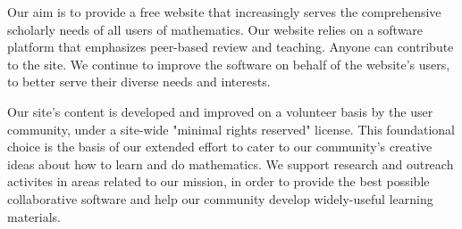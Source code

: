 Our aim is to provide a free website that increasingly serves the comprehensive
scholarly needs of all users of mathematics.
Our website relies on a software platform that emphasizes peer-based review and
teaching. Anyone can contribute to the site. We continue to improve the
software on behalf of the website's users, to better serve their diverse needs
and interests.

Our site's content is developed and improved on a volunteer basis by the user
community, under a site-wide "minimal rights reserved" license. This
foundational choice is the basis of our extended effort to cater to our
community's creative ideas about how to learn and do mathematics.
We support research and outreach activites in areas related to our mission, in
order to provide the best possible collaborative software and help our
community develop widely-useful learning materials.
